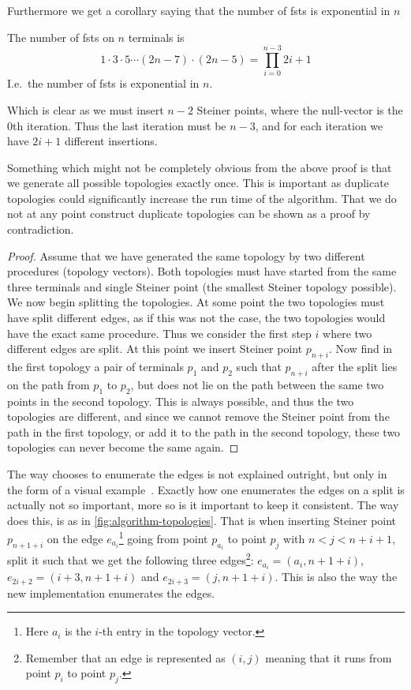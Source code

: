Furthermore we get a corollary saying that the number of \acp{fst} is
exponential in $n$

\begin{corollary}
  \label{cor:number-of-fsts}
  The number of \acp{fst} on $n$ terminals is
  \[
    1 \cdot 3 \cdot 5 \cdots (2n - 7) \cdot (2n - 5) = \prod_{i=0}^{n-3} 2i+1
  \]
  I.e.\ the number of \acp{fst} is exponential in $n$.
\end{corollary}

Which is clear as we must insert $n-2$ Steiner points, where the null-vector is
the $0$th iteration. Thus the last iteration must be $n-3$, and for each
iteration we have $2i+1$ different insertions.

Something which might not be completely obvious from the above proof is that we
generate all possible topologies exactly once. This is important as duplicate topologies
could significantly increase the run time of the algorithm. That we do not at
any point construct duplicate topologies can be shown as a proof by
contradiction.

\begin{proof}
  Assume that we have generated the same topology by two different procedures (topology
  vectors). Both topologies must have started from the same three terminals and
  single Steiner point (the smallest Steiner topology possible). We now begin
  splitting the topologies. At some point the two topologies must have split
  different edges, as if this was not the case, the two topologies would have
  the exact same procedure. Thus we consider the first step $i$ where two
  different edges are split. At this point we insert Steiner point
  $p_{n+i}$. Now find in the first topology a pair of terminals $p_1$ and $p_2$
  such that $p_{n+i}$ after the split lies on the path from $p_1$ to $p_2$, but
  does not lie on the path between the same two points in the second
  topology. This is always possible, and thus the two topologies are different,
  and since we cannot remove the Steiner point from the path in the first
  topology, or add it to the path in the second topology, these two topologies
  can never become the same again.
\end{proof}


The way \citeauthor{smith1992} chooses to enumerate the edges is not explained
outright, but only in the form of a visual
example~\cite[p.~143]{smith1992}. Exactly how one enumerates the edges on a
split is actually not so important, more so is it important to keep it
consistent. The way \citeauthor{smith1992} does this, is as in
\cref{fig:algorithm-topologies}. That is when inserting Steiner point
$p_{n+1+i}$ on the edge $e_{a_i}$\footnote{Here $a_i$ is the $i$-th entry in the
  topology vector.} going from point $p_{a_i}$ to point $p_j$ with
$n < j < n+i+1$, split it such that we get the following three
edges\footnote{Remember that an edge is represented as $(i,j)$ meaning that it
  runs from point $p_i$ to point $p_j$.}: $e_{a_{i}} = (a_{i}, n+1+i)$,
$ e_{2i + 2} = (i+3,n+1+i)$ and $ e_{2i + 3} = (j,n+1+i)$. This is also the way
the new implementation enumerates the edges.


